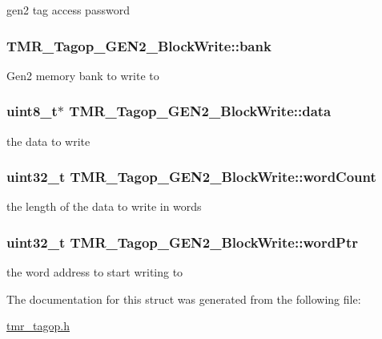 gen2 tag access password \hypertarget{struct_t_m_r___tagop___g_e_n2___block_write_cfa1f907071d9a3e935f28d722e35833}{
\subsubsection[{bank}]{ {\bf TMR\_\-Tagop\_\-GEN2\_\-BlockWrite::bank}}}
\label{struct_t_m_r___tagop___g_e_n2___block_write_cfa1f907071d9a3e935f28d722e35833}


Gen2 memory bank to write to \hypertarget{struct_t_m_r___tagop___g_e_n2___block_write_31099a65b191f94474363b0c25367f23}{
\subsubsection[{data}]{\setlength{\rightskip}{0pt plus 5cm}uint8\_\-t$\ast$ {\bf TMR\_\-Tagop\_\-GEN2\_\-BlockWrite::data}}}
\label{struct_t_m_r___tagop___g_e_n2___block_write_31099a65b191f94474363b0c25367f23}


the data to write \hypertarget{struct_t_m_r___tagop___g_e_n2___block_write_72f4be181aa38596747cce08565240ae}{
\subsubsection[{wordCount}]{\setlength{\rightskip}{0pt plus 5cm}uint32\_\-t {\bf TMR\_\-Tagop\_\-GEN2\_\-BlockWrite::wordCount}}}
\label{struct_t_m_r___tagop___g_e_n2___block_write_72f4be181aa38596747cce08565240ae}


the length of the data to write in words \hypertarget{struct_t_m_r___tagop___g_e_n2___block_write_0d5e283619a33d2518fc2d49ae7ef835}{
\subsubsection[{wordPtr}]{\setlength{\rightskip}{0pt plus 5cm}uint32\_\-t {\bf TMR\_\-Tagop\_\-GEN2\_\-BlockWrite::wordPtr}}}
\label{struct_t_m_r___tagop___g_e_n2___block_write_0d5e283619a33d2518fc2d49ae7ef835}


the word address to start writing to 

The documentation for this struct was generated from the following file:\begin{CompactItemize}
\item 
\hyperlink{tmr__tagop_8h}{tmr\_\-tagop.h}\end{CompactItemize}
